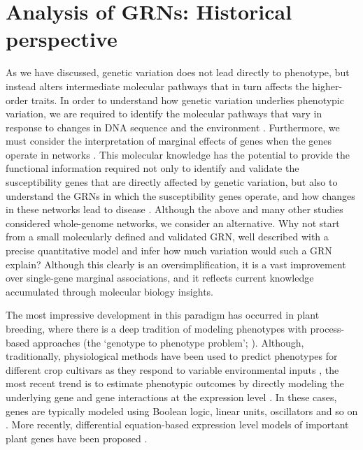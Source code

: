 \section{Analysis of GRNs: Historical perspective}
As we have discussed, genetic variation does not lead directly to phenotype, but instead alters intermediate molecular pathways that in turn affects the higher-order traits. In order to understand how genetic variation underlies phenotypic variation, we are required to identify the molecular pathways that vary in response to changes in DNA sequence and the environment \cite{Cooper2002, Sieberts2007}. Furthermore, we must consider the interpretation of marginal effects of genes when the genes operate in networks \cite{Cooper2005}. This molecular knowledge has the potential to provide the functional information required not only to identify and validate the susceptibility genes that are directly affected by genetic variation, but also to understand the GRNs in which the susceptibility genes operate, and how changes in these networks lead to disease \cite{Hammer2004, Schadt2008}. Although the above and many other studies considered whole-genome networks, we consider an alternative. Why not start from a small molecularly defined and validated GRN, well described with a precise quantitative model and infer how much variation would such a GRN explain? Although this clearly is an oversimplification, it is a vast improvement over single-gene marginal associations, and it reflects current knowledge accumulated through molecular biology insights.

The most impressive development in this paradigm has occurred in plant breeding, where there is a deep tradition of modeling phenotypes with process-based approaches (the `genotype to phenotype problem'; \cite{Cooper2002, Koduru2008}). Although, traditionally, physiological methods have been used to predict phenotypes for different crop cultivars as they respond to variable environmental inputs \cite{Sinclair1996, Hammer2004}, the most recent trend is to estimate phenotypic outcomes by directly modeling the underlying gene and gene interactions at the expression level \cite{Welch2003, Welch2005a}. In these cases, genes are typically modeled using Boolean logic, linear units, oscillators and so on \cite{Welch2005b, Ravasz2002}. More recently, differential equation-based expression level models of important plant genes have been proposed \cite{Locke2005a, Locke2005b}.

